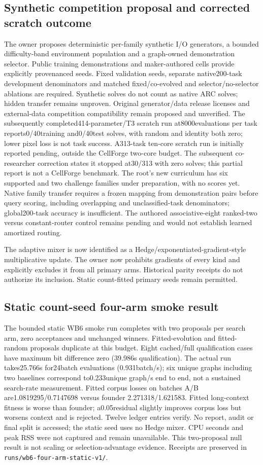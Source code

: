 \documentclass[11pt]{article}
\begin{document}
\subsection{Synthetic competition proposal and corrected scratch outcome}
The owner proposes deterministic per-family synthetic I/O generators, a bounded
difficulty-band environment population and a graph-owned demonstration selector.
Public training demonstrations and maker-authored cells provide explicitly
provenanced seeds. Fixed validation seeds, separate native200-task development
denominators and matched fixed/co-evolved and selector/no-selector ablations are
required. Synthetic solves do not count as native ARC solves; hidden transfer
remains unproven. Original generator/data release licenses and external-data
competition compatibility remain proposed and unverified.
The subsequently completed414-parameter/T3 scratch run at8000evaluations per
task reports0/40training and0/40test solves, with random and identity both zero;
lower pixel loss is not task success. A313-task ten-core scratch run is
initially reported pending, outside the CellForge two-core budget. The subsequent
co-researcher correction states it stopped at30/313 with zero solves; this partial
report is not a CellForge benchmark.
The root's new curriculum has six supported and two challenge families under
preparation, with no scores yet. Native family transfer requires a frozen mapping
from demonstration pairs before query scoring, including overlapping and
unclassified-task denominators; global200-task accuracy is insufficient.
The authored associative-eight ranked-two versus constant-router control remains
pending and would not establish learned amortized routing.

The adaptive mixer is now identified as a Hedge/exponentiated-gradient-style
multiplicative update. The owner now prohibits gradients of every kind and
explicitly excludes it from all primary arms. Historical parity receipts do not authorize its
inclusion. Static count-fitted primary seeds remain permitted.

\subsection{Static count-seed four-arm smoke result}
The bounded static WB6 smoke run completes with two proposals per search arm,
zero acceptances and unchanged winners. Fitted-evolution and fitted-random proposals
duplicate at this budget. Eight cached/full qualification cases have maximum bit
difference zero (39.986s qualification). The actual run takes25.766s for24batch
evaluations (0.931batch/s); six unique graphs including two baselines correspond
to0.233unique graph/s end to end, not a sustained search-rate measurement.
Fitted corpus losses on batches A/B are1.0819295/0.7147698 versus founder
2.271318/1.621583. Fitted long-context fitness is worse than founder; a0.05residual
slightly improves corpus loss but worsens context and is rejected. Twelve ledger
entries verify. No report, audit or final split is accessed; the static seed uses
no Hedge mixer. CPU seconds and peak RSS were not captured and remain unavailable.
This two-proposal null result is not scaling or selection-advantage evidence.
Receipts are preserved in \texttt{runs/wb6-four-arm-static-v1/}.
\end{document}
